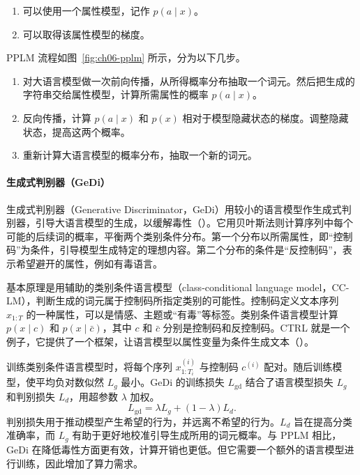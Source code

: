 \begin{enumerate}
\item 可以使用一个属性模型，记作 $p(a\mid x)$。
\item 可以取得该属性模型的梯度。
\end{enumerate}

PPLM 流程如图~\ref{fig:ch06-pplm} 所示，分为以下几步。

\begin{enumerate}
\item 对大语言模型做一次前向传播，从所得概率分布抽取一个词元。然后把生成的字符串交给属性模型，计算所需属性的概率 $p(a\mid x)$。
\item 反向传播，计算 $p(a\mid x)$ 和 $p(x)$ 相对于模型隐藏状态的梯度。调整隐藏状态，提高这两个概率。
\item 重新计算大语言模型的概率分布，抽取一个新的词元。
\end{enumerate}


\paragraph*{生成式判别器（GeDi）}
生成式判别器（Generative Discriminator，GeDi）用较小的语言模型作生成式判别器，引导大语言模型的生成，以缓解毒性（）。它用贝叶斯法则计算序列中每个可能的后续词的概率，平衡两个类别条件分布。第一个分布以所需属性，即“控制码”为条件，引导模型生成特定的理想内容。第二个分布的条件是“反控制码”，表示希望避开的属性，例如有毒语言。

基本原理是用辅助的类别条件语言模型（class-conditional language model，CC-LM），判断生成的词元属于控制码所指定类别的可能性。控制码定义文本序列 $x_{1:T}$ 的一种属性，可以是情感、主题或“有毒”等标签。类别条件语言模型计算 $p(x\mid c)$ 和 $p(x\mid\bar c)$，其中 $c$ 和 $\bar c$ 分别是控制码和反控制码。CTRL 就是一个例子，它提供了一个框架，让语言模型以属性变量为条件生成文本（）。

训练类别条件语言模型时，将每个序列 $x^{(i)}_{1:T_i}$ 与控制码 $c^{(i)}$ 配对。随后训练模型，使平均负对数似然 $L_g$ 最小。GeDi 的训练损失 $L_{\mathrm{gd}}$ 结合了语言模型损失 $L_g$ 和判别损失 $L_d$，用超参数 $\lambda$ 加权。
\begin{equation}
L_{\mathrm{gd}}=\lambda L_g+(1-\lambda)L_d.
\label{eq:ch06-gedi}
\end{equation}
判别损失用于推动模型产生希望的行为，并远离不希望的行为。$L_d$ 旨在提高分类准确率，而 $L_g$ 有助于更好地校准引导生成所用的词元概率。与 PPLM 相比，GeDi 在降低毒性方面更有效，计算开销也更低。但它需要一个额外的语言模型进行训练，因此增加了算力需求。

